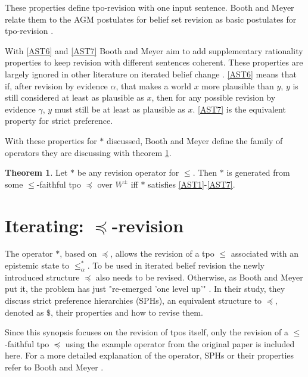 \documentclass[english, 12pt]{scrartcl}
\theoremstyle{definition}
\theoremstyle{definition}
\theoremstyle{definition}
\newtheorem{theorem}{Theorem}
\begin{document}
These properties define tpo-revision with one input sentence. Booth and Meyer relate them to the AGM postulates for belief set revision \cite{Alchourron1985} as basic postulates for tpo-revision \cite{Booth2011}.

With \ref{AST6} and \ref{AST7} Booth and Meyer aim to add supplementary rationality properties to keep revision with different sentences coherent. These properties are largely ignored in other literature on iterated belief change \cite{Booth2011}. \ref{AST6} means that if, after revision by evidence $\alpha$, that makes a world $x$ more plausible than $y$, $y$ is still considered at least as plausible as $x$, then for any possible revision by evidence $\gamma$, $y$ must still be at least as plausible as $x$. \ref{AST7} is the equivalent property for strict preference.

\bigskip

With these properties for $\ast$ discussed, Booth and Meyer define the family of operators they are discussing with theorem \ref{theorem:revision-operator}.

\begin{theorem}
\label{theorem:revision-operator}Let $\ast$ be any revision operator for $\leq$. Then $\ast$ is generated from some $\leq$-faithful tpo $\preceq$ over $W^{\pm}$ iff $\ast$ satisfies \ref{AST1}-\ref{AST7}. \cite{Booth2011}
\end{theorem}

\section{Iterating: $\preceq$-revision}
\label{section:iterating-preceq-revision}
The operator $\ast$, based on $\preceq$, allows the revision of a tpo $\leq$ associated with an epistemic state to $\leq_{\alpha}^{\ast}$. To be used in iterated belief revision the newly introduced structure $\preceq$ also needs to be revised. Otherwise, as Booth and Meyer put it, the problem has just "re-emerged 'one level up'" \cite{Booth2011}. In their study, they discuss strict preference hierarchies (SPHs), an equivalent structure to $\preceq$, denoted as $\$$, their properties and how to revise them.

Since this synopsis focuses on the revision of tpos itself, only the revision of a $\leq$-faithful tpo $\preceq$ using the example operator from the original paper is included here. For a more detailed explanation of the operator, SPHs or their properties refer to Booth and Meyer \cite{Booth2011}.
\end{document}
